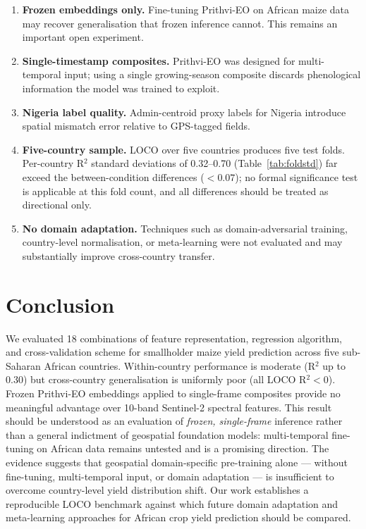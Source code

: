 \documentclass[journal]{IEEEtran}
\begin{document}
\begin{enumerate}
  \item \textbf{Frozen embeddings only.} Fine-tuning Prithvi-EO on African maize
        data may recover generalisation that frozen inference cannot.
        This remains an important open experiment.
  \item \textbf{Single-timestamp composites.} Prithvi-EO was designed for
        multi-temporal input; using a single growing-season composite
        discards phenological information the model was trained to exploit.
  \item \textbf{Nigeria label quality.} Admin-centroid proxy labels for Nigeria
        introduce spatial mismatch error relative to GPS-tagged fields.
  \item \textbf{Five-country sample.} LOCO over five countries produces five
        test folds. Per-country R$^2$ standard deviations of 0.32--0.70
        (Table~\ref{tab:foldstd}) far exceed the between-condition
        differences ($<0.07$); no formal significance test is applicable
        at this fold count, and all differences should be treated as
        directional only.
  \item \textbf{No domain adaptation.} Techniques such as domain-adversarial
        training, country-level normalisation, or meta-learning were not
        evaluated and may substantially improve cross-country transfer.
\end{enumerate}

\section{Conclusion}
\label{sec:conclusion}

We evaluated 18 combinations of feature representation, regression algorithm,
and cross-validation scheme for smallholder maize yield prediction across
five sub-Saharan African countries.
Within-country performance is moderate (R$^2$ up to 0.30) but
cross-country generalisation is uniformly poor (all LOCO R$^2 < 0$).
Frozen Prithvi-EO embeddings applied to single-frame composites provide no
meaningful advantage over 10-band Sentinel-2 spectral features.
This result should be understood as an evaluation of \emph{frozen, single-frame}
inference rather than a general indictment of geospatial foundation models:
multi-temporal fine-tuning on African data remains untested and is a promising
direction.
The evidence suggests that geospatial domain-specific pre-training alone —
without fine-tuning, multi-temporal input, or domain adaptation — is
insufficient to overcome country-level yield distribution shift.
Our work establishes a reproducible LOCO benchmark against which
future domain adaptation and meta-learning approaches for
African crop yield prediction should be compared.
\end{document}
